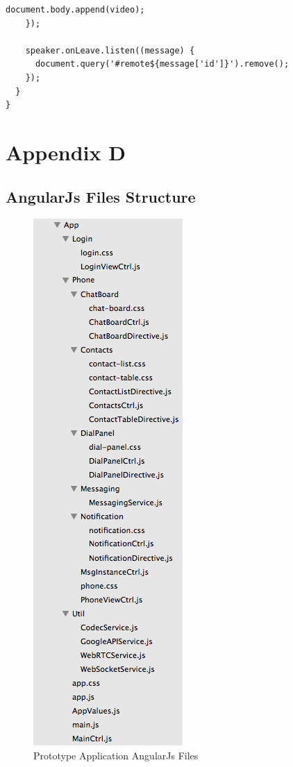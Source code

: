 \begin{appendices}
\begin{lstlisting}[caption={WebRTCCtrl in Dart application client},label={code:dart_webrtcctrl}]
      document.body.append(video);
    });

    speaker.onLeave.listen((message) {
      document.query('#remote${message['id']}').remove();
    });
  }
}
\end{lstlisting}

\chapter{Appendix D}

\section{AngularJs Files Structure} \label{code:angularjs_structure}

\begin{figure}
	\centering
    	\includegraphics[height=0.45\textheight,natwidth=610,natheight=642]{figs/angularjs_structure.png}
  	\caption{Prototype Application AngularJs Files}
  	\label{fig:angularjs_structure}
\end{figure}

\end{appendices}